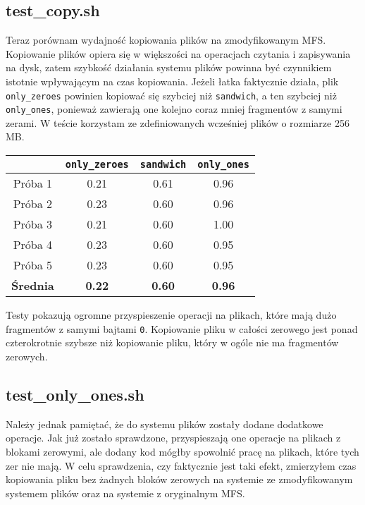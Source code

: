 \documentclass{sig-alternate-05-2015}
\begin{document}
\subsection{test\_copy.sh}
Teraz porównam wydajność kopiowania plików na zmodyfikowanym MFS.
Kopiowanie plików opiera się w większości na operacjach czytania i zapisywania na dysk, zatem szybkość działania systemu plików powinna być czynnikiem istotnie wpływającym na czas kopiowania.
Jeżeli łatka faktycznie działa, plik \texttt{only\_zeroes} powinien kopiować się szybciej niż \texttt{sandwich}, a ten szybciej niż \texttt{only\_ones}, ponieważ zawierają one kolejno coraz mniej fragmentów z samymi zerami.
W teście korzystam ze zdefiniowanych wcześniej plików o rozmiarze 256 MB.

\begin{center}\begin{tabular}{|c|c|c|c|}
    \hline
     & \texttt{only\_zeroes} & \texttt{sandwich} & \texttt{only\_ones}\\
    \hline
    Próba 1 & 0.21 & 0.61 & 0.96 \\
    \hline
    Próba 2 & 0.23 & 0.60 & 0.96 \\
    \hline
    Próba 3 & 0.21 & 0.60 & 1.00 \\
    \hline
    Próba 4 & 0.23 & 0.60 & 0.95 \\
    \hline
    Próba 5 & 0.23 & 0.60 & 0.95 \\
    \hline
    \textbf{Średnia} & \textbf{0.22} & \textbf{0.60} & \textbf{0.96} \\
    \hline
\end{tabular}\end{center}

Testy pokazują ogromne przyspieszenie operacji na plikach, które mają dużo fragmentów z samymi bajtami \texttt{0}. Kopiowanie pliku w całości zerowego jest ponad czterokrotnie szybsze niż kopiowanie pliku, który w ogóle nie ma fragmentów zerowych.

\subsection{test\_only\_ones.sh}
Należy jednak pamiętać, że do systemu plików zostały dodane dodatkowe operacje. Jak już zostało sprawdzone, przyspieszają one operacje na plikach z blokami zerowymi, ale dodany kod mógłby spowolnić pracę na plikach, które tych zer nie mają.
W celu sprawdzenia, czy faktycznie jest taki efekt, zmierzyłem czas kopiowania pliku bez żadnych bloków zerowych na systemie ze zmodyfikowanym systemem plików oraz na systemie z oryginalnym MFS.
\end{document}
